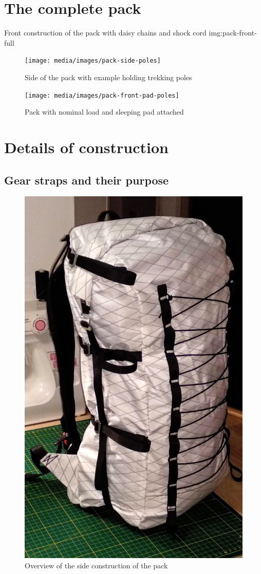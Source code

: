 \section{The complete pack}


{Front construction of the pack with daisy chains and shock cord}
{img:pack-front-full}

\begin{figure}[H]
  \centering
  \texttt{[image: media/images/pack-side-poles]}
  \caption{Side of the pack with example holding trekking poles}
  \label{img:pack-side-poles}
\end{figure}

\begin{figure}[H]
  \centering
  \texttt{[image: media/images/pack-front-pad-poles]}
  \caption{Pack with nominal load and sleeping pad attached}
  \label{img:pack-front-pad-poles}
\end{figure}

\section{Details of construction}

\subsection{Gear straps and their purpose}

\begin{figure}[H]
  \centering
  \includegraphics[width=.75\textwidth]{media/images/pack-side-full}
  \caption{Overview of the side construction of the pack}
  \label{img:pack-side-full}
\end{figure}

